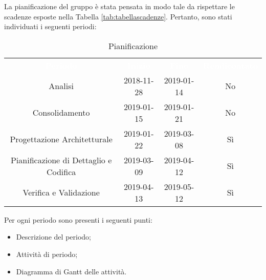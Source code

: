 La pianificazione del gruppo \gruppo \space è stata pensata in modo tale da rispettare le scadenze esposte nella Tabella \ref{tab:tabellascadenze}.\newline
Pertanto, sono stati individuati i seguenti periodi:

\renewcommand{\arraystretch}{1.5}
\begin{table}[H]	
	\begin{center}
	    \begin{tabular}{ c  c  c  c }
	        \rowcolor{greySWEight}
	        \textcolor{white}{\textbf{Periodo}} & \textcolor{white}{\textbf{Inizio}}& \textcolor{white}{\textbf{Fine}}&\textcolor{white}{\textbf{Rendicontato}}\\
	        Analisi & 2018-11-28 & 2019-01-14&No\\
	        Consolidamento & 2019-01-15 & 2019-01-21&No\\
	        Progettazione Architetturale & 2019-01-22 & 2019-03-08&Sì\\
	        Pianificazione di Dettaglio e Codifica & 2019-03-09 & 2019-04-12&Sì\\
	        Verifica e Validazione & 2019-04-13 & 2019-05-12&Sì\\
	    \end{tabular}
	    \caption{Pianificazione} \label{tab:pianificazione} 
	\end{center}
\end{table}


Per ogni periodo sono presenti i seguenti punti:
\begin{itemize}
	\item Descrizione del {periodo};
	\item Attività di periodo;
	\item {Diagramma di Gantt} delle attività.
\end{itemize}
